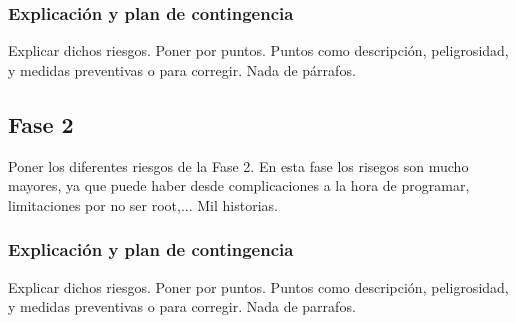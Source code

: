\subsubsection{Explicación y plan de contingencia}
{\color{red} Explicar dichos riesgos. Poner por puntos. Puntos como descripción, peligrosidad, y medidas preventivas o para corregir. Nada de párrafos.}

\subsection{Fase 2}
{\color{red} Poner los diferentes riesgos de la Fase 2. En esta fase los risegos son mucho mayores, ya que puede haber desde complicaciones a la hora de programar, limitaciones por no ser root,... Mil historias.}

\subsubsection{Explicación y plan de contingencia}
{\color{red} Explicar dichos riesgos. Poner por puntos. Puntos como descripción, peligrosidad, y medidas preventivas o para corregir. Nada de parrafos.}

